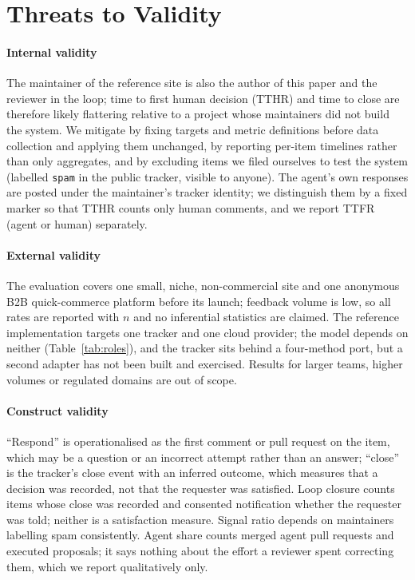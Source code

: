 \section{Threats to Validity}\label{sec:threats}
\paragraph{Internal validity}
The maintainer of the reference site is also the author of this paper and the reviewer in the loop; time to first human decision (TTHR) and time to close are therefore likely flattering relative to a project whose maintainers did not build the system. We mitigate by fixing targets and metric definitions before data collection and applying them unchanged, by reporting per-item timelines rather than only aggregates, and by excluding items we filed ourselves to test the system (labelled \texttt{spam} in the public tracker, visible to anyone). The agent's own responses are posted under the maintainer's tracker identity; we distinguish them by a fixed marker so that TTHR counts only human comments, and we report TTFR (agent or human) separately.

\paragraph{External validity}
The evaluation covers one small, niche, non-commercial site and one anonymous B2B quick-commerce platform before its launch; feedback volume is low, so all rates are reported with $n$ and no inferential statistics are claimed. The reference implementation targets one tracker and one cloud provider; the model depends on neither (Table~\ref{tab:roles}), and the tracker sits behind a four-method port, but a second adapter has not been built and exercised. Results for larger teams, higher volumes or regulated domains are out of scope.

\paragraph{Construct validity}
``Respond'' is operationalised as the first comment or pull request on the item, which may be a question or an incorrect attempt rather than an answer; ``close'' is the tracker's close event with an inferred outcome, which measures that a decision was recorded, not that the requester was satisfied. Loop closure counts items whose close was recorded and consented notification whether the requester was told; neither is a satisfaction measure. Signal ratio depends on maintainers labelling spam consistently. Agent share counts merged agent pull requests and executed proposals; it says nothing about the effort a reviewer spent correcting them, which we report qualitatively only.

